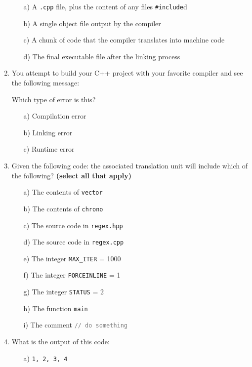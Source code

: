 \documentclass{article}
\begin{document}
\begin{enumerate}
	\begin{itemize}
		\item[a)] {A \texttt{.cpp} file, plus the content of any files \textcolor{BurntOrange}{\texttt{\#include}}d}
		\item[b)] A single object file output by the compiler
		\item[c)] A chunk of code that the compiler translates into machine code
		\item[d)] The final executable file after the linking process
	\end{itemize}
	\vspace{1em}
	\item You attempt to build your C++ project with your favorite compiler and see the following message:
	
	\noindent
	Which type of error is this?
	\begin{itemize}
		\item[a)] Compilation error
		\item[b)] {Linking error}
		\item[c)] Runtime error
	\end{itemize}
	\vspace{1em}
	\item Given the following code: 		
	the associated translation unit will include which of the following? \textbf{(select all that apply)}
	\begin{itemize}
		\item[a)] {The contents of \texttt{vector}}
		\item[b)] {The contents of \texttt{chrono}}
		\item[c)] {The source code in \texttt{regex.hpp}}
		\item[d)] The source code in \texttt{regex.cpp}
		\item[e)] The integer \texttt{MAX\_ITER} = 1000
		\item[f)] {The integer \texttt{FORCEINLINE} = 1}
		\item[g)] The integer \texttt{STATUS} = 2
		\item[h)] {The function \texttt{main}}
		\item[i)] The comment \textcolor{Gray}{\texttt{// do something}}
	\end{itemize}
	\pagebreak
	\item What is the output of this code:
	
	\begin{itemize}
		\item[a)] \texttt{1, 2, 3, 4}

\end{itemize}
\end{enumerate}
\end{document}
